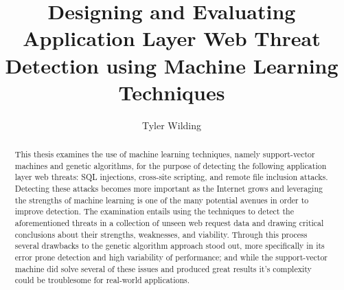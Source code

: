 \documentclass[12pt, normalmargins, doublespaced]{ut-thesis}
\author{Tyler Wilding}
\title{Designing and Evaluating Application Layer Web Threat Detection using Machine Learning Techniques}
\begin{document}
\begin{preliminary}

\maketitle


\begin{abstract}

This thesis examines the use of machine learning techniques, namely support-vector machines and genetic algorithms, for the purpose of detecting the following application layer web threats: SQL injections, cross-site scripting, and remote file inclusion attacks.  Detecting these attacks becomes more important as the Internet grows and leveraging the strengths of machine learning is one of the many potential avenues in order to improve detection.  The examination entails using the techniques to detect the aforementioned threats in a collection of unseen web request data and drawing critical conclusions about their strengths, weaknesses, and viability.  
Through this process several drawbacks to the genetic algorithm approach stood out, more specifically in its error prone detection and high variability of performance; and while the support-vector machine did solve several of these issues and produced great results it's complexity could be troublesome for real-world applications.

\end{abstract}




\end{preliminary}
\end{document}
